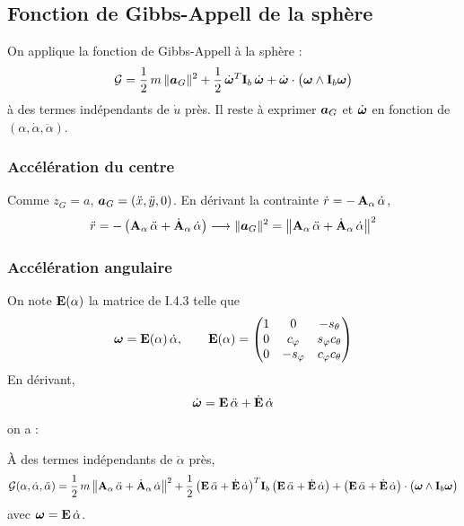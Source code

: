 \subsection{Fonction de Gibbs-Appell de la sphère}

On applique la fonction de Gibbs-Appell à la sphère :
\[
    \mathcal{G} = \frac{1}{2}\,m\,\|\bm{a}_G\|^2
    + \frac{1}{2}\,\dot{\bm{\omega}}^T\mathbf{I}_b\,\dot{\bm{\omega}}
    + \dot{\bm{\omega}}\cdot\bigl(\bm{\omega}\wedge
    \mathbf{I}_b\bm{\omega}\bigr)
\]
à des termes indépendants de $\dot u$ près. Il reste à exprimer
$\bm{a}_G$ et $\dot{\bm{\omega}}$ en fonction de
$(\alpha,\dot\alpha,\ddot\alpha)$.

\subsubsection{Accélération du centre}

Comme $z_G = a$, $\bm{a}_G = (\ddot x,\ddot y,0)$. En dérivant la
contrainte $\dot r = -\,\mathbf{A}_\alpha\,\dot\alpha$,
\[
    \ddot r = -\,\bigl(\mathbf{A}_\alpha\,\ddot\alpha
    + \dot{\mathbf{A}}_\alpha\,\dot\alpha\bigr)
    \longrightarrow
    \|\bm{a}_G\|^2 = \bigl\|\mathbf{A}_\alpha\,\ddot\alpha
    + \dot{\mathbf{A}}_\alpha\,\dot\alpha\bigr\|^2
\]

\subsubsection{Accélération angulaire}

On note $\mathbf{E}(\alpha)$ la matrice de I.4.3 telle que
\[
    \bm{\omega} = \mathbf{E}(\alpha)\,\dot\alpha,
    \qquad
    \mathbf{E}(\alpha) = \begin{pmatrix}
        1 & 0 & -s_\theta\\
        0 & c_\varphi & s_\varphi c_\theta\\
        0 & -s_\varphi & c_\varphi c_\theta
    \end{pmatrix}
\]
En dérivant,
\[
    \dot{\bm{\omega}} = \mathbf{E}\,\ddot\alpha + \dot{\mathbf{E}}\,\dot\alpha
\]
on  a :
\begin{proposition}
    À des termes indépendants de $\ddot\alpha$ près,
    \[
        \mathcal{G}(\alpha,\dot\alpha,\ddot\alpha)
        = \frac{1}{2}\,m\,\bigl\|\mathbf{A}_\alpha\,\ddot\alpha
        + \dot{\mathbf{A}}_\alpha\,\dot\alpha\bigr\|^2
        + \frac{1}{2}\,\bigl(\mathbf{E}\,\ddot\alpha
        + \dot{\mathbf{E}}\,\dot\alpha\bigr)^T\mathbf{I}_b\,
        \bigl(\mathbf{E}\,\ddot\alpha + \dot{\mathbf{E}}\,\dot\alpha\bigr)
        + \bigl(\mathbf{E}\,\ddot\alpha + \dot{\mathbf{E}}\,\dot\alpha\bigr)
        \cdot\bigl(\bm{\omega}\wedge\mathbf{I}_b\bm{\omega}\bigr)
    \]
    avec $\bm{\omega} = \mathbf{E}\,\dot\alpha$.
\end{proposition}

